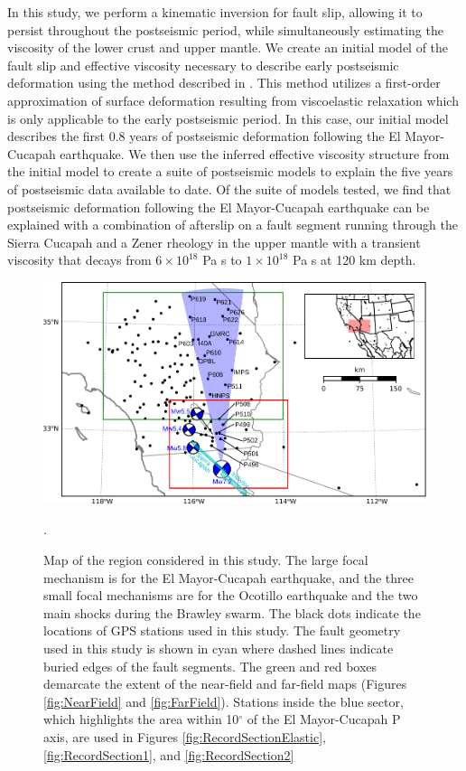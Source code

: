 \documentclass[draft,linenumbers]{AGUJournal}
\begin{document}
In this study, we perform a kinematic inversion for fault slip, allowing it to persist throughout the postseismic period, while simultaneously estimating the viscosity of the lower crust and upper mantle.  We create an initial model of the fault slip and effective viscosity necessary to describe early postseismic deformation using the method described in \citet{Hines2016}.  This method utilizes a first-order approximation of surface deformation resulting from viscoelastic relaxation which is only applicable to the early postseismic period. In this case, our initial model describes the first 0.8 years of postseismic deformation following the El Mayor-Cucapah earthquake.  We then use the inferred effective viscosity structure from the initial model to create a suite of postseismic models to explain the five years of postseismic data available to date.  Of the suite of models tested, we find that postseismic deformation following the El Mayor-Cucapah earthquake can be explained with a combination of afterslip on a fault segment running through the Sierra Cucapah and a Zener rheology in the upper mantle with a transient viscosity that decays from $6\times10^{18}$ Pa s to $1\times10^{18}$ Pa s at 120 km depth. 

\begin{figure}
\includegraphics[scale=0.8]{Figures/ContextMap} 
\caption{Map of the region considered in this study.  The large focal mechanism is for the El Mayor-Cucapah earthquake, and the three small focal mechanisms are for the Ocotillo earthquake and the two main shocks during the Brawley swarm.  The black dots indicate the locations of GPS stations used in this study.  The fault geometry used in this study is shown in cyan where dashed lines indicate buried edges of the fault segments.  The green and red boxes demarcate the extent of the near-field and far-field maps (Figures \ref{fig:NearField} and \ref{fig:FarField}).  Stations inside the blue sector, which highlights the area within 10$^\circ$ of the El Mayor-Cucapah P axis, are used in Figures \ref{fig:RecordSectionElastic}, \ref{fig:RecordSection1}, and \ref{fig:RecordSection2}}.       
\label{fig:ContextMap}
\end{figure}
\end{document}
